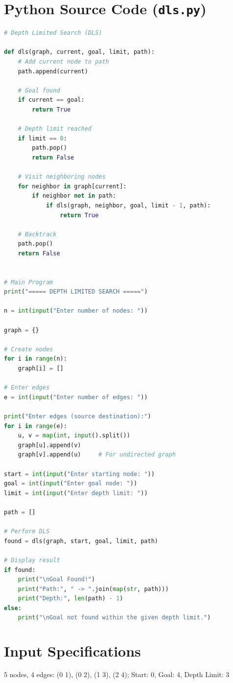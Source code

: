 \documentclass[11pt,a4paper]{report}
\begin{document}
\section{Python Source Code (\texttt{dls.py})}
\begin{lstlisting}[language=Python]
# Depth Limited Search (DLS)

def dls(graph, current, goal, limit, path):
    # Add current node to path
    path.append(current)

    # Goal found
    if current == goal:
        return True

    # Depth limit reached
    if limit == 0:
        path.pop()
        return False

    # Visit neighboring nodes
    for neighbor in graph[current]:
        if neighbor not in path:
            if dls(graph, neighbor, goal, limit - 1, path):
                return True

    # Backtrack
    path.pop()
    return False


# Main Program
print("===== DEPTH LIMITED SEARCH =====")

n = int(input("Enter number of nodes: "))

graph = {}

# Create nodes
for i in range(n):
    graph[i] = []

# Enter edges
e = int(input("Enter number of edges: "))

print("Enter edges (source destination):")
for i in range(e):
    u, v = map(int, input().split())
    graph[u].append(v)
    graph[v].append(u)     # For undirected graph

start = int(input("Enter starting node: "))
goal = int(input("Enter goal node: "))
limit = int(input("Enter depth limit: "))

path = []

# Perform DLS
found = dls(graph, start, goal, limit, path)

# Display result
if found:
    print("\nGoal Found!")
    print("Path:", " -> ".join(map(str, path)))
    print("Depth:", len(path) - 1)
else:
    print("\nGoal not found within the given depth limit.")
\end{lstlisting}

\section{Input Specifications}
5 nodes, 4 edges: (0 1), (0 2), (1 3), (2 4); Start: 0, Goal: 4, Depth Limit: 3
\end{document}
